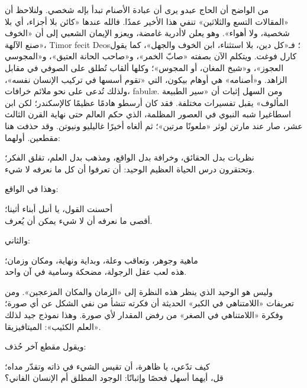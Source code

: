 من الواضح أن الحاج عبدو يرى أن عبادة الأصنام تبدأ بإله شخصي. ولنلاحظ أن «المقالات التسع والثلاثين» تنفي هذا الأخير عمدًا. فالله عندها «كائن بلا أجزاء، أي بلا شخصية، ولا أهواء». وهو يعلن لاأدرية غامضة، ويعزو الإيمان الشعبي إلى أن «الخوف صنع الآلهة»، \textenglish{Timor fecit Deos}؛ فـ«كل دين، بلا استثناء، ابن الخوف والجهل»، كما يقول كارل فوغت. ويتكلم الآن بصفته «صابّ الخمر»، و«صاحب الحانة العتيق»، و«المجوسي العجوز»، و«شيخ المغان، أو المجوس»؛ وكلها ألقاب تُطلق على الصوفي في مقابل الزاهد. و«أصنامه» هي أوهام بيكون، التي «تقوم أسسها في تركيب الإنسان نفسه»، ولذلك تُدعى على نحو ملائم خرافات، \textenglish{fabulæ}. ومن السهل إثبات أن «سير الطبيعة المألوف» يقبل تفسيرات مختلفة. فقد كان أرسطو هادمًا عظيمًا كالإسكندر؛ لكن ابن اسطاغيرا شبه النبوي في العصور المظلمة، الذي حكم العالم حتى نهاية القرن الثالث عشر، صار عند مارتن لوثر «ملعونًا مرتين»؛ ثم ألغاه أخيرًا غاليليو ونيوتن. وقد حذفت هنا مقطعين. أولهما:

\begin{SourceQuotation}
نظريات بدل الحقائق، وخرافة بدل الواقع، ومذهب بدل العلم، تقلق الفكر؛\\
وتحتقرون درس الحياة العظيم الوحيد: أن تعرفوا أن كل ما نعرفه لا شيء.
\end{SourceQuotation}

وهذا في الواقع:

\begin{SourceQuotation}
أحسنت القول، يا أنبل أبناء أثينا؛\\
أقصى ما نعرفه أن لا شيء يمكن أن يُعرف.
\end{SourceQuotation}

والثاني:

\begin{SourceQuotation}
ماهية وجوهر، وتعاقب وعلة، وبداية ونهاية، ومكان وزمان؛\\
هذه لعب عقل الرجولة، مضحكة وسامية في آن واحد.
\end{SourceQuotation}

وليس هو الوحيد الذي ينظر هذه النظرة إلى «الزمان والمكان المزعجين». ومن تعريفات «اللامتناهي في الكبر» الحديثة أن فكرته تنشأ من نفي الشكل عن أي صورة؛ وفكرة «اللامتناهي في الصغر» من رفض المقدار لأي صورة. وهذا نموذج جيد لذلك «العلم الكئيب»: الميتافيزيقا.

ويقول مقطع آخر حُذف:

\begin{SourceQuotation}
كيف تدّعي، يا ظاهرة، أن تقيس الشيء في ذاته وتقدّر مداه؛\\
قل، أيهما أسهل فحصًا وإثباتًا: الوجود المطلق أم الإنسان الفاني؟
\end{SourceQuotation}

